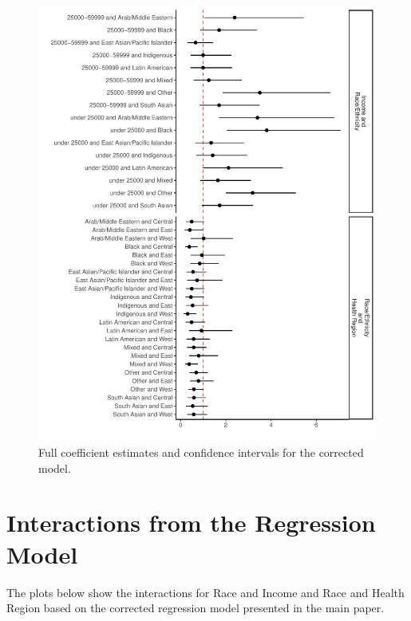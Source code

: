 \documentclass[
]{article}
\begin{document}
\begin{figure}

\includegraphics{appendix_files/figure-pdf/fig-model-corr-appendix-1.pdf} \hfill{}

\caption{\label{fig-model-corr-appendix}Full coefficient estimates and
confidence intervals for the corrected model.}

\end{figure}

\FloatBarrier

\hypertarget{interactions-from-the-regression-model}{%
\section{Interactions from the Regression
Model}\label{interactions-from-the-regression-model}}

The plots below show the interactions for Race and Income and Race and
Health Region based on the corrected regression model presented in the
main paper.
\end{document}
